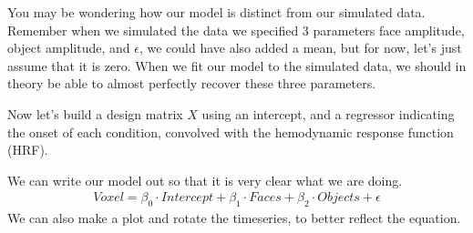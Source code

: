 \documentclass[letterpaper,10pt,english]{sphinxmanual}
\begin{document}
You may be wondering how our model is distinct from our simulated data. Remember when we simulated the data we specified 3 parameters \sphinxhyphen{} face amplitude, object amplitude, and \(\epsilon\), we could have also added a mean, but for now, let’s just assume that it is zero. When we fit our model to the simulated data, we should in theory be able to almost perfectly recover these three parameters.

Now let’s build a design matrix \(X\) using an intercept, and a regressor indicating the onset of each condition, convolved with the hemodynamic response function (HRF).

\begin{sphinxVerbatim}[commandchars=\\\{\}]
  
  
  
\PYG{p}{[}  \PYG{p}{]}  
  
\PYG{p}{[}  \PYG{p}{]}  
  
  \PYG{p}{[}      \PYG{p}{]}

\end{sphinxVerbatim}

\noindent{}

We can write our model out so that it is very clear what we are doing.
\begin{equation*}
\begin{split}Voxel = \beta_0 \cdot Intercept + \beta_1 \cdot Faces + \beta_2 \cdot Objects + \epsilon\end{split}
\end{equation*}
We can also make a plot and rotate the timeseries, to better reflect the equation.
\end{document}
